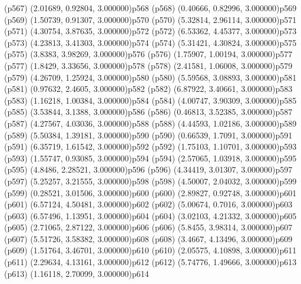 \psdot(p567)
\psPoint(2.01689, 0.92804, 3.000000){p568}
\psdot(p568)
\psPoint(0.40666, 0.82996, 3.000000){p569}
\psdot(p569)
\psPoint(1.50739, 0.91307, 3.000000){p570}
\psdot(p570)
\psPoint(5.32814, 2.96114, 3.000000){p571}
\psdot(p571)
\psPoint(4.30754, 3.87635, 3.000000){p572}
\psdot(p572)
\psPoint(6.53362, 4.45377, 3.000000){p573}
\psdot(p573)
\psPoint(4.23813, 3.41303, 3.000000){p574}
\psdot(p574)
\psPoint(5.31421, 4.30824, 3.000000){p575}
\psdot(p575)
\psPoint(3.8383, 3.98269, 3.000000){p576}
\psdot(p576)
\psPoint(1.75907, 1.00194, 3.000000){p577}
\psdot(p577)
\psPoint(1.8429, 3.33656, 3.000000){p578}
\psdot(p578)
\psPoint(2.41581, 1.06008, 3.000000){p579}
\psdot(p579)
\psPoint(4.26709, 1.25924, 3.000000){p580}
\psdot(p580)
\psPoint(5.59568, 3.08893, 3.000000){p581}
\psdot(p581)
\psPoint(0.97632, 2.4605, 3.000000){p582}
\psdot(p582)
\psPoint(6.87922, 3.40661, 3.000000){p583}
\psdot(p583)
\psPoint(1.16218, 1.00384, 3.000000){p584}
\psdot(p584)
\psPoint(4.00747, 3.90309, 3.000000){p585}
\psdot(p585)
\psPoint(3.53844, 3.1388, 3.000000){p586}
\psdot(p586)
\psPoint(0.46813, 3.52385, 3.000000){p587}
\psdot(p587)
\psPoint(4.27567, 4.03036, 3.000000){p588}
\psdot(p588)
\psPoint(4.44593, 1.02186, 3.000000){p589}
\psdot(p589)
\psPoint(5.50384, 1.39181, 3.000000){p590}
\psdot(p590)
\psPoint(0.66539, 1.7091, 3.000000){p591}
\psdot(p591)
\psPoint(6.35719, 1.61542, 3.000000){p592}
\psdot(p592)
\psPoint(1.75103, 1.10701, 3.000000){p593}
\psdot(p593)
\psPoint(1.55747, 0.93085, 3.000000){p594}
\psdot(p594)
\psPoint(2.57065, 1.03918, 3.000000){p595}
\psdot(p595)
\psPoint(4.8486, 2.28521, 3.000000){p596}
\psdot(p596)
\psPoint(4.34419, 3.01307, 3.000000){p597}
\psdot(p597)
\psPoint(5.25257, 3.21555, 3.000000){p598}
\psdot(p598)
\psPoint(4.50007, 2.04032, 3.000000){p599}
\psdot(p599)
\psPoint(0.28521, 3.01506, 3.000000){p600}
\psdot(p600)
\psPoint(2.89827, 0.92748, 3.000000){p601}
\psdot(p601)
\psPoint(6.57124, 4.50481, 3.000000){p602}
\psdot(p602)
\psPoint(5.00674, 0.7016, 3.000000){p603}
\psdot(p603)
\psPoint(6.57496, 1.13951, 3.000000){p604}
\psdot(p604)
\psPoint(3.02103, 4.21332, 3.000000){p605}
\psdot(p605)
\psPoint(2.71065, 2.87122, 3.000000){p606}
\psdot(p606)
\psPoint(5.8455, 3.98314, 3.000000){p607}
\psdot(p607)
\psPoint(5.51726, 3.58382, 3.000000){p608}
\psdot(p608)
\psPoint(3.4667, 4.13496, 3.000000){p609}
\psdot(p609)
\psPoint(1.51764, 3.46701, 3.000000){p610}
\psdot(p610)
\psPoint(2.05575, 4.10898, 3.000000){p611}
\psdot(p611)
\psPoint(2.29634, 4.13161, 3.000000){p612}
\psdot(p612)
\psPoint(5.74776, 1.49666, 3.000000){p613}
\psdot(p613)
\psPoint(1.16118, 2.70099, 3.000000){p614}
